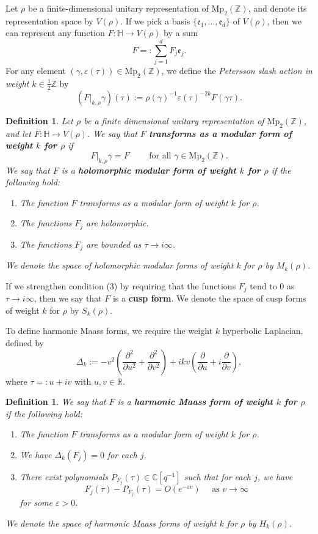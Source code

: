 \documentclass[11pt,reqno]{amsart}
\newtheorem{definition}[theorem]{Definition}
\newcommand{\R}{\mathbb{R}}
\newcommand{\C}{\mathbb{C}}
\newcommand{\Z}{\mathbb{Z}}
\renewcommand{\=}{\;=\;}
\theoremstyle{myremark}
\begin{document}
Let $\rho$ be a finite-dimensional unitary representation of $\mathrm{Mp}_2(\Z)$, and denote its representation space by $V(\rho)$.
If we pick a basis $\{\mathfrak e_1,\ldots,\mathfrak e_d\}$ of $V(\rho)$, 
then we can represent any function 
$F\colon\mathbb H\rightarrow V(\rho)$ by a sum
\[
F=:\sum_{j=1}^d F_j\mathfrak e_j. 
\]
\noindent
For any element $(\gamma,\varepsilon(\tau))\in\mathrm{Mp}_2(\Z)$, we define the 
{\it Petersson slash action in weight $k\in\frac12\Z$}
by 
\[
\left(F\big|_{k,\rho}\gamma\right)(\tau):=\rho(\gamma)^{-1}\varepsilon(\tau)^{-2k}
F(\gamma\tau).
\]
\begin{definition}
Let $\rho$ be a finite dimensional unitary representation of $\mathrm{Mp}_2(\Z)$, and let $F\colon\mathbb H\rightarrow V(\rho)$. We say that $F$ {\bf transforms as a modular form of weight $k$ for $\rho$} if 
\[
F\big|_{k,\rho}\gamma=F \quad\quad\text{ for all }  \gamma\in\mathrm{Mp}_2(\Z). 
\]
We say that $F$ is a {\bf holomorphic modular form of weight $k$ for $\rho$} if the following hold:
\begin{enumerate}
\renewcommand{\labelenumi}{\textup{(\arabic{enumi})}}
    \item The function $F$ transforms as a modular form of weight $k$ for $\rho$. 
    \item The functions $F_j$ are holomorphic. 
    \item The functions $F_j$ are bounded as $\tau\rightarrow i\infty$.
\end{enumerate}
We denote the space of holomorphic modular forms of weight $k$ for $\rho$ by $M_k(\rho)$.
\end{definition}
If we strengthen condition (3) by requiring  that the functions $F_j$ tend to $0$ as $\tau\rightarrow i\infty$, then we say that $F$ is a {\bf cusp form}. 
We denote the space of cusp forms of weight $k$ for $\rho$ by $S_k(\rho)$.

To define harmonic Maass forms, we require the weight $k$ hyperbolic Laplacian, defined by 
\[\Delta_k:=-v^2\left(\frac{\partial^2}{\partial u^2}+\frac{\partial^2}{\partial v^2}\right)+ikv\left(\frac{\partial}{\partial u}+i\frac{\partial}{\partial v}\right),
\]
where $\tau=:u+iv$ with $u,v\in\R$.
\begin{definition}
We say that $F$ is a {\bf harmonic Maass form of weight $k$ for $\rho$} if the following hold:
\begin{enumerate}
\renewcommand{\labelenumi}{\textup{(\arabic{enumi})}}
    \item The function $F$ transforms as a modular form of weight $k$ for $\rho$.
    \item We have $\Delta_k(F_j)=0$  for each $j$.
    \item There exist polynomials $P_{F_j}(\tau)\in\C[q^{-1}]$ such that for each $j$, we have \[
    F_j(\tau)-P_{F_j}(\tau)=O\left(e^{-\varepsilon v}\right) \quad \text{ as } v\rightarrow\infty
    \]
    for some $\varepsilon>0$. 
\end{enumerate}
We denote the space of harmonic Maass forms of weight $k$ for $\rho$ by $H_k(\rho)$.
\end{definition}
\end{document}
